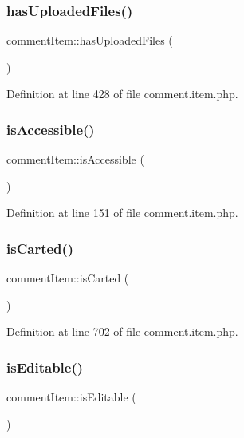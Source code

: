\subsubsection{\texorpdfstring{has\+Uploaded\+Files()}{hasUploadedFiles()}}
{\footnotesize\ttfamily comment\+Item\+::has\+Uploaded\+Files (\begin{DoxyParamCaption}{ }\end{DoxyParamCaption})}



Definition at line 428 of file comment.\+item.\+php.

\hypertarget{classcommentItem_a5a175cf38e7a6dd7b1b771b198388e25}{}\label{classcommentItem_a5a175cf38e7a6dd7b1b771b198388e25} 
\subsubsection{\texorpdfstring{is\+Accessible()}{isAccessible()}}
{\footnotesize\ttfamily comment\+Item\+::is\+Accessible (\begin{DoxyParamCaption}{ }\end{DoxyParamCaption})}



Definition at line 151 of file comment.\+item.\+php.

\hypertarget{classcommentItem_aee548a05480bd060de454017aa8be318}{}\label{classcommentItem_aee548a05480bd060de454017aa8be318} 
\subsubsection{\texorpdfstring{is\+Carted()}{isCarted()}}
{\footnotesize\ttfamily comment\+Item\+::is\+Carted (\begin{DoxyParamCaption}{ }\end{DoxyParamCaption})}



Definition at line 702 of file comment.\+item.\+php.

\hypertarget{classcommentItem_a53a357acf0d2d4c951505383c94a6373}{}\label{classcommentItem_a53a357acf0d2d4c951505383c94a6373} 
\subsubsection{\texorpdfstring{is\+Editable()}{isEditable()}}
{\footnotesize\ttfamily comment\+Item\+::is\+Editable (\begin{DoxyParamCaption}{ }\end{DoxyParamCaption})}



